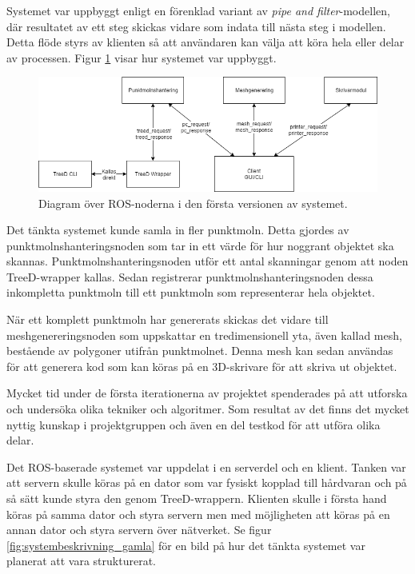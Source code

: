 Systemet var uppbyggt enligt en förenklad variant av \textit{pipe and filter}-modellen, där resultatet av ett steg skickas vidare som indata till nästa steg i modellen. Detta flöde styrs av klienten så att användaren kan välja att köra hela eller delar av processen. Figur \ref{fig:noddiagram} visar hur systemet var uppbyggt.

\begin{figure}[H]
	\centering
	\includegraphics[width=130mm]{figures/Noddiagram.png}
	\caption{Diagram över ROS-noderna i den första versionen av systemet.}
	\label{fig:noddiagram}
\end{figure}

Det tänkta systemet kunde samla in fler punktmoln. Detta gjordes av punktmolnshanteringsnoden som tar in ett värde för hur noggrant objektet ska skannas. Punktmolnshanteringsnoden utför ett antal skanningar genom att noden TreeD-wrapper kallas. Sedan registrerar punktmolnshanteringsnoden dessa inkompletta punktmoln till ett punktmoln som representerar hela objektet.

När ett komplett punktmoln har genererats skickas det vidare till meshgenereringsnoden som uppskattar en tredimensionell yta, även kallad mesh, bestående av polygoner utifrån punktmolnet. Denna mesh kan sedan användas för att generera kod som kan köras på en 3D-skrivare för att skriva ut objektet.

Mycket tid under de första iterationerna av projektet spenderades på att utforska och undersöka olika tekniker och algoritmer. Som resultat av det finns det mycket nyttig kunskap i projektgruppen och även en del testkod för att utföra olika delar.

Det ROS-baserade systemet var uppdelat i en serverdel och en klient. Tanken var att servern skulle köras på en dator som var fysiskt kopplad till hårdvaran och på så sätt kunde styra den genom TreeD-wrappern. Klienten skulle i första hand köras på samma dator och styra servern men med möjligheten att köras på en annan dator och styra servern över nätverket. Se figur \ref{fig:systembeskrivning_gamla} för en bild på hur det tänkta systemet var planerat att vara strukturerat.

